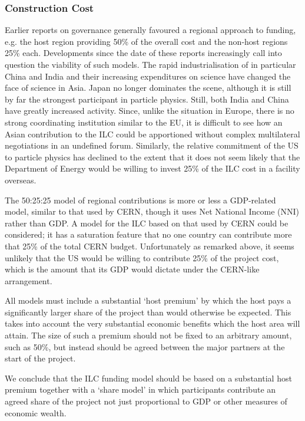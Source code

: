 \subsubsection{Construction Cost}

Earlier reports on governance generally favoured a regional approach to funding, e.g. the host region providing 50\% of the overall cost and the non-host regions 25\% each. Developments since the date of these reports increasingly call into question the viability of such models. The rapid industrialisation of in particular China and India and their increasing expenditures on science have changed the face of science in Asia. Japan no longer dominates the scene, although it is still by far the strongest participant in particle physics. Still, both India and China have greatly increased activity. Since, unlike the situation in Europe, there is no strong coordinating institution similar to the EU, it is difficult to see how an Asian contribution to the ILC could be apportioned without complex multilateral negotiations in an undefined forum. Similarly, the relative commitment of the US to particle physics has declined to the extent that it does not seem likely that the Department of Energy would be willing to invest 25\% of the ILC cost in a facility overseas.
 
The 50:25:25 model of regional contributions is more or less a GDP-related model, similar to that used by CERN, though it uses Net National Income (NNI) rather than GDP. A model for the ILC based on that used by CERN could be considered; it has a saturation feature that no one country can contribute more that 25\% of the total CERN budget. Unfortunately as remarked above, it seems unlikely that the US would be willing to contribute 25\% of the project cost, which is the amount that its GDP would dictate under the CERN-like arrangement.
 
All models must include a substantial `host premium' by which the host pays a significantly larger share of the project than would otherwise be expected. This takes into account the very substantial economic benefits which the host area will attain. The size of such a premium should not be fixed to an arbitrary amount, such as 50\%, but instead should be agreed between the major partners at the start of the project.

We conclude that the ILC funding model should be based on a substantial host premium together with a `share model' in which participants contribute an agreed share of the project not just proportional to GDP or other measures of economic wealth.
 
